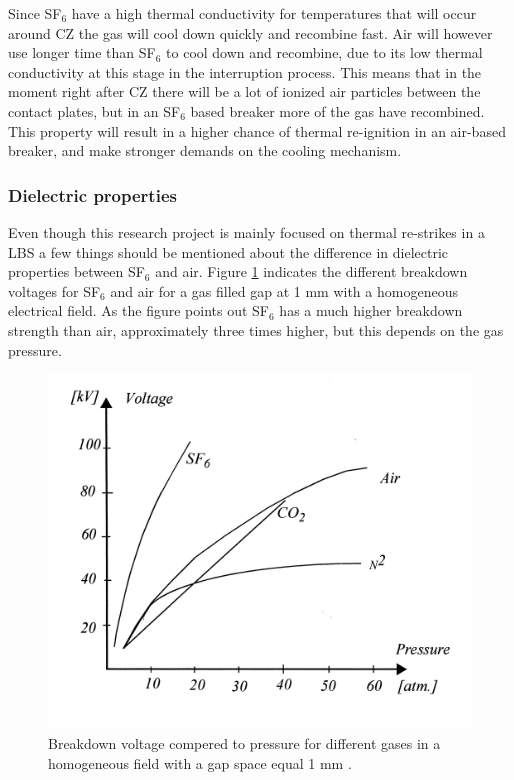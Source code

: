 \documentclass[10pt,a4paper,twoside]{article}
\begin{document}
Since SF${_6}$ have a high thermal conductivity for temperatures that will occur around CZ the gas will cool down quickly and recombine fast. Air will however use longer time than SF${_6}$ to cool down and recombine, due to its low thermal conductivity at this stage in the interruption process. This means that in the moment right after CZ there will be a lot of ionized air particles between the contact plates, but in an SF${_6}$ based breaker more of the gas have recombined. This property will result in a higher chance of thermal re-ignition in an air-based breaker, and make stronger demands on the cooling mechanism.

\subsubsection*{Dielectric properties} 

Even though this research project is mainly focused on thermal re-strikes in a LBS a few things should be mentioned about the difference in dielectric properties between SF${_6}$ and air. Figure \ref{fig:breakDownVoltage} indicates the different breakdown voltages for SF$_6$ and air for a gas filled gap at 1 mm with a homogeneous electrical field. As the figure points out SF$_6$ has a much higher breakdown strength than air, approximately three times higher, but this depends on the gas pressure.

\begin{figure}[H]
\centering
\includegraphics[scale=1]{Bilder/Discussion/Breakdown_voltage.png}
\caption{Breakdown voltage compered to pressure for different gases in a homogeneous field with a gap space equal 1 mm  \cite{bib:TET4160HVIM}.} \label{fig:breakDownVoltage}
\end{figure}
\end{document}
